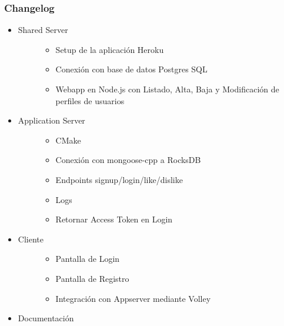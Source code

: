 \documentclass[letterpaper,10pt,english]{sphinxmanual}
\begin{document}
\subsubsection{Changelog}
\label{manuals:changelog}\begin{itemize}
\item {} \begin{description}
\item[{Shared Server}] \leavevmode\begin{itemize}
\item {} 
Setup de la aplicación Heroku

\item {} 
Conexión con base de datos Postgres SQL

\item {} 
Webapp en Node.js con Listado, Alta, Baja y Modificación de perfiles de usuarios

\end{itemize}

\end{description}

\item {} \begin{description}
\item[{Application Server}] \leavevmode\begin{itemize}
\item {} 
CMake

\item {} 
Conexión con mongoose-cpp a RocksDB

\item {} 
Endpoints signup/login/like/dislike

\item {} 
Logs

\item {} 
Retornar Access Token en Login

\end{itemize}

\end{description}

\item {} \begin{description}
\item[{Cliente}] \leavevmode\begin{itemize}
\item {} 
Pantalla de Login

\item {} 
Pantalla de Registro

\item {} 
Integración con Appserver mediante Volley

\end{itemize}

\end{description}

\item {} 
Documentación

\end{itemize}
\end{document}
